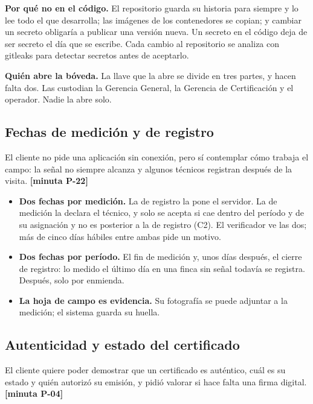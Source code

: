 \documentclass[11pt,letterpaper]{article}
\newcommand{\resp}[1]{\textrm{\footnotesize\bfseries [minuta #1]}}
\begin{document}
\textbf{Por qué no en el código.} El repositorio guarda su historia para siempre y lo lee todo el que
desarrolla; las imágenes de los contenedores se copian; y cambiar un secreto obligaría a publicar una
versión nueva. Un secreto en el código deja de ser secreto el día que se escribe. Cada cambio al
repositorio se analiza con gitleaks para detectar secretos antes de aceptarlo.

\textbf{Quién abre la bóveda.} La llave que la abre se divide en tres partes, y hacen falta dos. Las
custodian la Gerencia General, la Gerencia de Certificación y el operador. Nadie la abre solo.

\subsection{Fechas de medición y de registro}
\label{sec:fechas}

El cliente no pide una aplicación sin conexión, pero sí contemplar cómo trabaja el campo: la señal no
siempre alcanza y algunos técnicos registran después de la visita. \resp{P-22}

\begin{itemize}
\item \textbf{Dos fechas por medición.} La de registro la pone el servidor. La de medición la declara el
      técnico, y solo se acepta si cae dentro del período y de su asignación y no es posterior a la
      de registro (C2). El verificador ve las dos; más de cinco días hábiles entre ambas pide un motivo.
\item \textbf{Dos fechas por período.} El fin de medición y, unos días después, el cierre de registro:
      lo medido el último día en una finca sin señal todavía se registra. Después, solo por enmienda.
\item \textbf{La hoja de campo es evidencia.} Su fotografía se puede adjuntar a la medición; el sistema
      guarda su huella.
\end{itemize}

\subsection{Autenticidad y estado del certificado}
\label{sec:certificado}

El cliente quiere poder demostrar que un certificado es auténtico, cuál es su estado y quién autorizó
su emisión, y pidió valorar si hace falta una firma digital. \resp{P-04}
\end{document}
